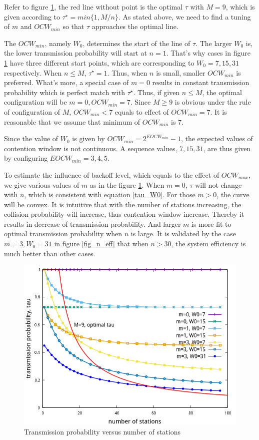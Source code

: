 Refer to figure \ref{fig_n_tau}, the red line without point is the optimal $\tau$ with $M=9$, which is given according to $\tau^\star = min\lbrace 1, M/n \rbrace$.
As stated above, we need to find a tuning of $m$ and $OCW_{min}$ so that $\tau$ approaches the optimal line.

The $OCW_{min}$, namely $W_0$, determines the start of the line of $\tau$. The larger $W_0$ is, the lower transmission probability will start at $n=1$. 
That's why cases in figure \ref{fig_n_tau} have three different start points, which are corresponding to $W_0 = 7,15, 31$ respectively.
When $n \leq M$, $\tau^\star = 1$. Thus, when $n$ is small, smaller $OCW_{min}$ is preferred. What's more, a special case of $m=0$ results in constant transmission probability which is perfect match with $\tau^\star$. 
Thus, if given $n\leq M$, the optimal configuration will be $m=0, OCW_{min} = 7$. Since $M \geq 9$ is obvious under the rule of configuration of $M$, $OCW_{min} < 7$ equals to effect of $OCW_{min} = 7$. It is reasonable that we assume that minimum of $OCW_{min}$ is $7$. 

Since the value of $W_0$ is given by $OCW_{min} = 2^{EOCW_{min}}-1$, the expected values of contention window is not continuous. A sequence values, $7, 15, 31$, are thus given by configuring $EOCW_{min} = 3,4,5$. 


To estimate the influence of backoff level, which equals to the effect of $OCW_{max}$, we give various values of $m$ as in the figure \ref{fig_n_tau}.
When $m=0$, $\tau$ will not change with $n$, which is consistent with equation \ref{tau_W0}.
For those $m>0$, the curve will be convex. It is intuitive that with the number of stations increasing, the collision probability will increase, thus contention window increase. Thereby it results in decrease of transmission probability. 
And larger $m$ is more fit to optimal transmission probability when $n$ is large. 
It is validated by the case $m=3, W_0 = 31$ in figure \ref{fig_n_eff} that when $n > 30$, the system efficiency is much better than other cases.


\begin{figure}[!ht]
\centering
\includegraphics[scale=.54]{./figure/n_tau_perf.png}
\caption{Transmission probability versus number of stations}
\label{fig_n_tau}
\end{figure}

